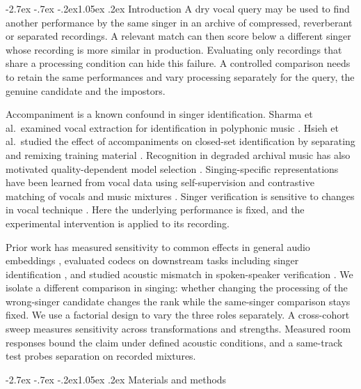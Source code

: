\documentclass[10pt,a4paper]{article}
\makeatletter
\renewcommand\section{\@startsection{section}{1}{\z@}%
  {-2.7ex \@plus -.7ex \@minus -.2ex}{1.05ex \@plus .2ex}%
  {\normalfont\large\sffamily\bfseries}}
\makeatother
\begin{document}
\section{Introduction}
A dry vocal query may be used to find another performance by the same singer in an archive of compressed, reverberant or separated recordings. A relevant match can then score below a different singer whose recording is more similar in production. Evaluating only recordings that share a processing condition can hide this failure. A controlled comparison needs to retain the same performances and vary processing separately for the query, the genuine candidate and the impostors.

Accompaniment is a known confound in singer identification. Sharma et al.\ examined vocal extraction for identification in polyphonic music \cite{sharma}. Hsieh et al.\ studied the effect of accompaniments on closed-set identification by separating and remixing training material \cite{hsieh}. Recognition in degraded archival music has also motivated quality-dependent model selection \cite{balakrishnan}. Singing-specific representations have been learned from vocal data using self-supervision \cite{torres,yakura} and contrastive matching of vocals and music mixtures \cite{cvsm}. Singer verification is sensitive to changes in vocal technique \cite{toma}. Here the underlying performance is fixed, and the experimental intervention is applied to its recording.

Prior work has measured sensitivity to common effects in general audio embeddings \cite{deng}, evaluated codecs on downstream tasks including singer identification \cite{codecbench}, and studied acoustic mismatch in spoken-speaker verification \cite{ferras,sveritas}. We isolate a different comparison in singing: whether changing the processing of the wrong-singer candidate changes the rank while the same-singer comparison stays fixed. We use a factorial design to vary the three roles separately. A cross-cohort sweep measures sensitivity across transformations and strengths. Measured room responses bound the claim under defined acoustic conditions, and a same-track test probes separation on recorded mixtures.

\section{Materials and methods}
\end{document}
